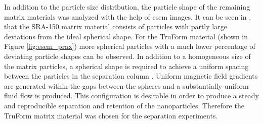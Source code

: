 In addition to the particle size distribution, the particle shape of the remaining matrix materials was analyzed with the help of \gls{esem} images. It can be seen in \cite{AndreMaster}, that the SRA-150 matrix material consists of particles with partly large deviations from the ideal spherical shape. For the TruForm material (shown in Figure \ref{fig:esem_prax}) more spherical particles with a much lower percentage of deviating particle shapes can be observed. In addition to a homogeneous size of the matrix particles, a spherical shape is required to achieve a uniform spacing between the particles in the separation column \cite{miltenyi1997magnetic}. Uniform magnetic field gradients are generated within the gaps between the spheres and a substantially uniform fluid flow is produced. This configuration is desirable in order to produce a steady and reproducible separation and retention of the nanoparticles. Therefore the TruForm matrix material was chosen for the separation experiments.          
\FloatBarrier
